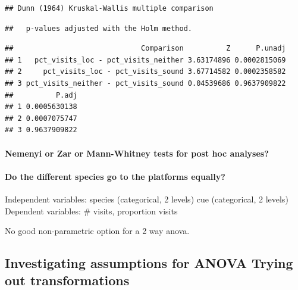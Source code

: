 \documentclass[]{article}
\newenvironment{Shaded}{\begin{snugshade}}{\end{snugshade}}
\newcommand{\KeywordTok}[1]{\textcolor[rgb]{0.13,0.29,0.53}{\textbf{{#1}}}}
\newcommand{\DataTypeTok}[1]{\textcolor[rgb]{0.13,0.29,0.53}{{#1}}}
\newcommand{\StringTok}[1]{\textcolor[rgb]{0.31,0.60,0.02}{{#1}}}
\newcommand{\OtherTok}[1]{\textcolor[rgb]{0.56,0.35,0.01}{{#1}}}
\newcommand{\NormalTok}[1]{{#1}}
\let\oldparagraph\paragraph
\renewcommand{\paragraph}[1]{\oldparagraph{#1}\mbox{}}
\begin{document}
\begin{Shaded}
\end{Shaded}

\begin{verbatim}
## Dunn (1964) Kruskal-Wallis multiple comparison
\end{verbatim}

\begin{verbatim}
##   p-values adjusted with the Holm method.
\end{verbatim}

\begin{verbatim}
##                              Comparison          Z      P.unadj
## 1   pct_visits_loc - pct_visits_neither 3.63174896 0.0002815069
## 2     pct_visits_loc - pct_visits_sound 3.67714582 0.0002358582
## 3 pct_visits_neither - pct_visits_sound 0.04539686 0.9637909822
##          P.adj
## 1 0.0005630138
## 2 0.0007075747
## 3 0.9637909822
\end{verbatim}

\paragraph{Nemenyi or Zar or Mann-Whitney tests for post hoc
analyses?}\label{nemenyi-or-zar-or-mann-whitney-tests-for-post-hoc-analyses}

\paragraph{Do the different species go to the platforms
equally?}\label{do-the-different-species-go-to-the-platforms-equally}

Independent variables: species (categorical, 2 levels) cue (categorical,
2 levels) Dependent variables: \# visits, proportion visits

No good non-parametric option for a 2 way anova.

\subsection{Investigating assumptions for ANOVA Trying out
transformations}\label{investigating-assumptions-for-anova-trying-out-transformations}
\end{document}

